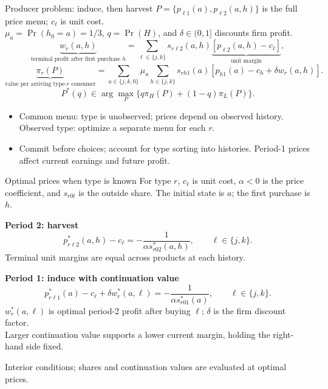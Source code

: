 \documentclass[aspectratio=169,11pt]{beamer}
\begin{document}
\begin{frame}[label=producer-problem]{Producer problem: induce, then harvest}
\small\setlength{\parskip}{3pt}
$P=\{p_{\ell1}(a),p_{\ell2}(a,h)\}$ is the full price menu; $c_\ell$ is unit cost.\\
$\mu_a=\Pr(h_0=a)=1/3$, $q=\Pr(H)$, and $\delta\in(0,1]$ discounts firm profit.
\[
\underbrace{w_r(a,h)}_{\text{terminal profit after first purchase }h}
=\sum_{\ell\in\{j,k\}}s_{r\ell2}(a,h)
\underbrace{[p_{\ell2}(a,h)-c_\ell]}_{\text{unit margin}},
\]
\[
\underbrace{\pi_r(P)}_{\text{value per arriving type-}r\text{ consumer}}
=\sum_{a\in\{j,k,0\}}\mu_a\sum_{h\in\{j,k\}}s_{rh1}(a)
\left[p_{h1}(a)-c_h+\delta w_r(a,h)\right].
\]
\[
P^*(q)\in\arg\max_P\{q\pi_H(P)+(1-q)\pi_L(P)\}.
\]
\begin{itemize}
\item Common menu: type is unobserved; prices depend on observed history. Observed type: optimize a separate menu for each $r$.
\item Commit before choices; account for type sorting into histories. Period-1 prices affect current earnings and future profit.
\end{itemize}
\end{frame}

\begin{frame}[label=optimal-price-conditions]{Optimal prices when type is known}
\small For type $r$, $c_\ell$ is unit cost, $\alpha<0$ is the price coefficient, and $s_{r0t}$ is the outside share. The initial state is $a$; the first purchase is $h$.
\par\medskip\textbf{Period 2: harvest}
\[
p^*_{r\ell2}(a,h)-c_\ell=-\frac{1}{\alpha s^*_{r02}(a,h)},\qquad \ell\in\{j,k\}.
\]
Terminal unit margins are equal across products at each history.

\par\medskip\textbf{Period 1: induce with continuation value}
\[
p^*_{r\ell1}(a)-c_\ell+\delta w_r^*(a,\ell)
=-\frac{1}{\alpha s^*_{r01}(a)},\qquad \ell\in\{j,k\}.
\]
$w_r^*(a,\ell)$ is optimal period-2 profit after buying $\ell$; $\delta$ is the firm discount factor.\\
Larger continuation value supports a lower current margin, holding the right-hand side fixed.

\footnotesize Interior conditions; shares and continuation values are evaluated at optimal prices.
\hfill\hyperlink{unobserved-price-conditions}{}
\end{frame}
\end{document}
